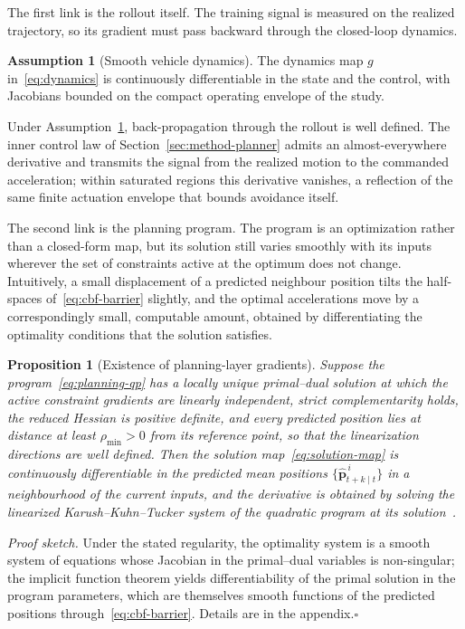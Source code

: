 \documentclass[11pt]{article}
\theoremstyle{plain}
\newtheorem{proposition}{Proposition}
\theoremstyle{definition}
\newtheorem{assumption}{Assumption}
\begin{document}
The first link is the rollout itself. The training signal is measured
on the realized trajectory, so its gradient must pass backward through
the closed-loop dynamics.
 
\begin{assumption}[Smooth vehicle dynamics]
	\label{ass:dynamics}
	The dynamics map $g$ in~\eqref{eq:dynamics} is continuously
	differentiable in the state and the control, with Jacobians bounded
	on the compact operating envelope of the study.
\end{assumption}
 
Under Assumption~\ref{ass:dynamics}, back-propagation through the
rollout is well defined. The inner control law of
Section~\ref{sec:method-planner} admits an almost-everywhere
derivative and transmits the signal from the realized motion to the
commanded acceleration; within saturated regions this derivative
vanishes, a reflection of the same finite actuation envelope that
bounds avoidance itself.
 
The second link is the planning program. The program is an
optimization rather than a closed-form map, but its solution still
varies smoothly with its inputs wherever the set of constraints active
at the optimum does not change. Intuitively, a small displacement of a
predicted neighbour position tilts the half-spaces
of~\eqref{eq:cbf-barrier} slightly, and the optimal accelerations move
by a correspondingly small, computable amount, obtained by
differentiating the optimality conditions that the solution satisfies.
 
\begin{proposition}[Existence of planning-layer gradients]
	\label{prop:gradient}
	Suppose the program~\eqref{eq:planning-qp} has a locally unique
	primal--dual solution at which the active constraint gradients are
	linearly independent, strict complementarity holds, the reduced Hessian is positive
	definite, and every predicted position lies at distance at least
	$\rho_{\min} > 0$ from its reference point, so that the
	linearization directions are well defined. Then the solution
	map~\eqref{eq:solution-map} is continuously differentiable in the
	predicted mean positions $\{\hat{\bm{p}}^{\,i}_{t+k \mid t}\}$ in
	a neighbourhood of the current inputs, and the derivative is
	obtained by solving the linearized Karush--Kuhn--Tucker system of
	the quadratic program at its
	solution~\citep{mandi2024decisionfocused,chen2021projection}.
\end{proposition}
 
\noindent\emph{Proof sketch.}
Under the stated regularity, the optimality system is a smooth system
of equations whose Jacobian in the primal--dual variables is
non-singular; the implicit function theorem yields differentiability
of the primal solution in the program parameters, which are themselves
smooth functions of the predicted positions
through~\eqref{eq:cbf-barrier}. Details are in the
appendix.\hfill$\square$
 
\end{document}
